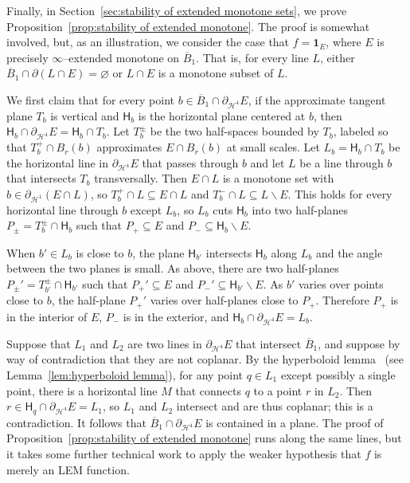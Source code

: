 \documentclass[11pt,reqno]{amsart}
\newcommand{\cH}{\mathcal{H}}
\newcommand{\0}{\mathbf{0}}
\renewcommand{\1}{\mathbf 1}
\newcommand{\one}{\mathbf{1}}
\renewcommand{\subset}{\subseteq}
\renewcommand{\setminus}{\smallsetminus}
\renewcommand{\emptyset}{\varnothing}
\theoremstyle{remark}
\begin{document}
Finally, in Section~\ref{sec:stability of extended monotone sets}, we prove Proposition~\ref{prop:stability of extended monotone}.  The proof is somewhat involved, but, as an illustration, we consider the case that $f=\one_E$, where $E$ is precisely $\infty$--extended monotone on $\overline{B}_1$.  That is, for every line $L$, either $\overline{B}_1\cap \partial(L\cap E)=\emptyset$ or $L\cap E$ is a monotone subset of $L$.

We first claim that for every point $b\in {\overline{B}_1}\cap \partial_{\cH^4} E$, if the approximate tangent plane $T_b$ is vertical and $\mathsf{H}_b$ is the horizontal plane centered at $b$, then $\mathsf{H}_b\cap \partial_{\cH^4} E=\mathsf{H}_b\cap T_b$.  Let $T_b^\pm$ be the two half-spaces bounded by $T_b$, labeled so that $T_b^+\cap B_r(b)$ approximates $E\cap B_r(b)$ at small scales.  Let $L_b=\mathsf{H}_b\cap T_b$ be the horizontal line in $\partial_{\cH^4} E$ that passes through $b$ and let $L$ be a line through $b$ that intersects $T_b$ transversally.  Then $E\cap L$ is a monotone set with $b\in \partial_{\cH^1}(E\cap L)$, so $T_b^+\cap L \subset E\cap L$ and $T_b^-\cap L\subset  L\setminus E$.  This holds for every horizontal line through $b$ except $L_b$, so $L_b$ cuts $\mathsf{H}_b$ into two half-planes $P_\pm=T_b^\pm\cap \mathsf{H}_b$ such that $P_+\subset E$ and $P_-\subset \mathsf{H}_b\setminus E$.

When $b'\in L_b$ is close to $b$, the plane $\mathsf{H}_{b'}$ intersects $\mathsf{H}_{b}$ along $L_b$ and the angle between the two planes is small.  As above, there are two half-planes $P_\pm'=T_{b'}^\pm\cap \mathsf{H}_{b'}$ such that $P_+'\subset E$ and $P_-'\subset \mathsf{H}_{b'}\setminus E$.  As $b'$ varies over points close to $b$, the half-plane $P_+'$ varies over half-planes close to $P_+$.  Therefore $P_+$ is in the interior of $E$, $P_-$ is in the exterior, and $\mathsf{H}_b\cap \partial_{\cH^4} E=L_b$.

Suppose that $L_{1}$ and $L_{2}$ are two lines in $\partial_{\cH^4} E$ that intersect $\overline{B}_1$, and suppose by way of contradiction that they are not coplanar.  By the hyperboloid lemma~\cite[Lemma~2.4]{CheegerKleinerMetricDiff} (see Lemma~\ref{lem:hyperboloid lemma}), for any point $q\in L_1$ except possibly a single point, there is a horizontal line $M$ that connects $q$ to a point $r$ in $L_2$.  Then $r\in \mathsf{H}_q\cap \partial_{\cH^4} E=L_1$, so $L_1$ and $L_2$ intersect and are thus coplanar; this is a contradiction.  It follows that $\overline{B}_1\cap \partial_{\cH^4} E$ is contained in a plane.  The proof of Proposition~\ref{prop:stability of extended monotone} runs along the same lines, but it takes some further technical work to apply the weaker hypothesis that $f$ is merely an LEM function.
\end{document}

